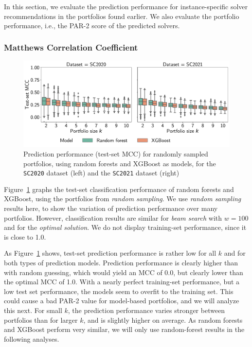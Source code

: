 \documentclass[runningheads]{llncs}
\begin{document}
In this section, we evaluate the prediction performance for instance-specific solver recommendations in the portfolios found earlier. 
We also evaluate the portfolio performance, i.e., the PAR-2 score of the predicted solvers.

\subsubsection{Matthews Correlation Coefficient}

\begin{figure}[htb]
	\centering
	\includegraphics[width=\columnwidth]{plots/prediction-test-mcc.pdf}
	\caption{
		Prediction performance (test-set MCC) for randomly sampled portfolios, using random forests and XGBoost as models, for the \texttt{SC2020} dataset (left) and the \texttt{SC2021} dataset (right)
	}
	\label{fig:prediction-test-mcc}
\end{figure}

Figure~\ref{fig:prediction-test-mcc} graphs the test-set classification performance of random forests and XGBoost, using the portfolios from \emph{random sampling}.
We use \emph{random sampling} results here, to show the variation of prediction performance over many portfolios.
However, classification results are similar for \emph{beam search} with $w=100$ and for the \emph{optimal solution}.
We do not display training-set performance, since it is close to 1.0.

As Figure~\ref{fig:prediction-test-mcc} shows, test-set prediction performance is rather low for all $k$ and for both types of prediction models.
Prediction performance is clearly higher than with random guessing, which would yield an MCC of 0.0, but clearly lower than the optimal MCC of 1.0.
With a nearly perfect training-set performance, but a low test set performance, the models seem to overfit to the training set.
This could cause a bad \mbox{PAR-2} value for model-based portfolios, and we will analyze this next.
For small $k$, the prediction performance varies stronger between portfolios than for larger $k$, and is slightly higher on average.
As random forests and XGBoost perform very similar, we will only use random-forest results in the following analyses.
\end{document}
